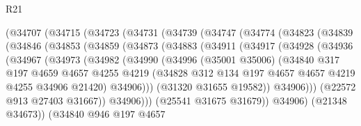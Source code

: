 \begin{lexlean}{R21}
\begin{coremodule}
        (@34707
          (@34715
            (@34723
              (@34731
                (@34739
                  (@34747
                    (@34774
                      (@34823
                        (@34839
                          (@34846
                            (@34853
                              (@34859
                                (@34873
                                  (@34883
                                    (@34911
                                      (@34917
                                        (@34928
                                          (@34936
                                            (@34967
                                              (@34973
                                                (@34982
                                                  (@34990
                                                    (@34996
                                                      (@35001 @35006)
                                                      (@34840
                                                        @317
                                                        @197
                                                        @4659
                                                        @4657
                                                        @4255
                                                        @4219
                                                        (@34828
                                                          @312
                                                          @134
                                                          @197
                                                          @4657
                                                          @4657
                                                          @4219
                                                          @4255
                                                          @34906
                                                          @21420)
                                                        @34906)))
                                                  (@31320 @31655 @19582))
                                                @34906)))
                                          (@22572 @913 @27403 @31667))
                                        @34906)))
                                  (@25541 @31675 @31679))
                                @34906)
                              (@21348 @34673))
                            (@34840
                              @946
                              @197
                              @4657

\end{coremodule}
\end{lexlean}
